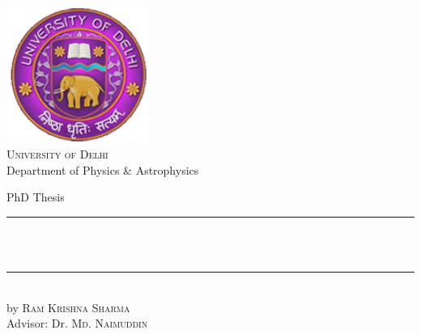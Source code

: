 \begin{titlepage}
	\begin{addmargin}[-1cm]{-3cm}
    \begin{center}
        \large
    \includegraphics[width=0.35\textwidth]{figures/logo_du.jpg}\\
        \vfill
        {\Large \textsc{University of Delhi}}\\[1ex]
        Department of Physics \& Astrophysics\\

        \vfill

        PhD Thesis\\ \vskip1cm
        \rule{14cm}{0.4pt} \\ \bigskip
            {} \\ \bigskip
        \rule{14cm}{0.4pt}\\ \vskip1cm
        by \textsc{Ram Krishna Sharma}\\
        \vfill
        Advisor: Dr. \textsc{Md. Naimuddin}\\

        \vfill
        \vfill
        \vfill

    \end{center}
  \end{addmargin}
\end{titlepage}
